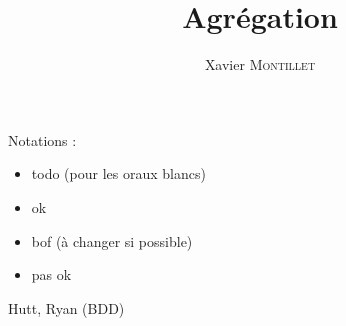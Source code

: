 \documentclass[10pt,a4paper,notitlepage]{report}
\newcommand{\green}[1]{
	\textcolor{OliveGreen}{#1}
}
\newcommand{\blue}[1]{
	\textcolor{blue}{#1}
}
\newcommand{\orange}[1]{
	\textcolor{orange}{#1}
}
\newcommand{\red}[1]{
	\textcolor{red}{#1}
}
\newcommand{\ok}{\green{\ding{52}}}
\newcommand{\todo}{\blue{\ding{228}}}
\newcommand{\bof}{\orange{\Yingyang}}
\newcommand{\nok}{\red{\ding{56}}}
\providecommand{\base}{.}
\begin{document}
\title{Agrégation}
\author{Xavier \textsc{Montillet}}
\maketitle

\newpage
Notations :
\begin{itemize}
	\item[\todo] todo (pour les oraux blancs)
	\item[\ok] ok
	\item[\bof] bof (à changer si possible)
	\item[\nok] pas ok
\end{itemize}



Hutt, Ryan (BDD)


\end{document}
